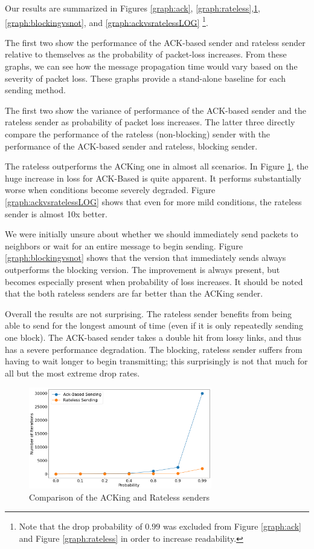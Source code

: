 Our results are summarized in Figures \ref{graph:ack}, \ref{graph:rateless},\ref{graph:ackvsrateless}, \ref{graph:blockingvsnot}, and \ref{graph:ackvsratelessLOG} \footnote{Note that the drop probability of $0.99$ was excluded from Figure \ref{graph:ack} and Figure \ref{graph:rateless} in order to increase readability.}.

The first two show the performance of the ACK-based sender and rateless sender relative to themselves as the probability of packet-loss increases. From these graphs, we can see how the message propagation time would vary based on the severity of packet loss. These graphs provide a stand-alone baseline for each sending method.  

The first two show the variance of performance of the ACK-based sender and the rateless sender as probability of packet loss increases. The latter three directly compare the performance of the rateless (non-blocking) sender with the performance of the ACK-based sender and rateless, blocking sender. 

The rateless outperforms the ACKing one in almost all scenarios. In Figure \ref{graph:ackvsrateless}, the huge increase in loss for ACK-Based is quite apparent. It performs substantially worse when conditions become severely degraded. Figure \ref{graph:ackvsratelessLOG} shows that even for more mild conditions, the rateless sender is almost 10x better.

We were initially unsure about whether we should immediately send packets to neighbors or wait for an entire message to begin sending. Figure \ref{graph:blockingvsnot} shows that the version that immediately sends always outperforms the blocking version. The improvement is always present, but becomes especially present when probability of loss increases. It should be noted that the both rateless senders are far better than the ACKing sender.

Overall the results are not surprising. The rateless sender benefits from being able to send for the longest amount of time (even if it is only repeatedly sending one block). The ACK-based sender takes a double hit from lossy links, and thus has a severe performance degradation. The blocking, rateless sender suffers from having to wait longer to begin transmitting; this surprisingly is not that much for all but the most extreme drop rates.

\begin{figure}[tp]
\centering
\noindent
\includegraphics[width=8cm]{figures/big_font/ack_comp.png}
\caption{Comparison of the ACKing and Rateless senders}
\label{graph:ackvsrateless}
\end{figure}


